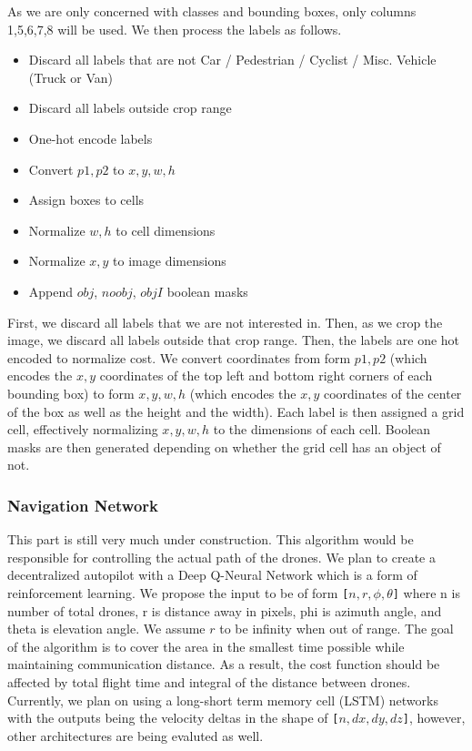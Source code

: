 \documentclass{article}
\begin{document}
As we are only concerned with classes and bounding boxes, only columns 1,5,6,7,8 will be used. We then process the labels as follows.

\begin{itemize}
    \item Discard all labels that are not Car / Pedestrian / Cyclist / Misc. Vehicle (Truck or Van)
    \item Discard all labels outside crop range
    \item One-hot encode labels
    \item Convert $p1, p2$ to $x, y, w, h$
    \item Assign boxes to cells
    \item Normalize $w, h$ to cell dimensions
    \item Normalize $x, y$ to image dimensions
    \item Append $obj$, $noobj$, $objI$ boolean masks
\end{itemize}

First, we discard all labels that we are not interested in. Then, as we crop the image, we discard all labels outside that crop range. Then, the labels are one hot encoded to normalize cost. We convert coordinates from form $p1, p2$ (which encodes the $x, y$ coordinates of the top left and bottom right corners of each bounding box) to form $x, y, w, h$ (which encodes the $x, y$ coordinates of the center of the box as well as the height and the width). Each label is then assigned a grid cell, effectively normalizing $x, y, w, h$ to the dimensions of each cell. Boolean masks are then generated depending on whether the grid cell has an object of not.

\subsubsection{Navigation Network}
This part is still very much under construction. This algorithm would be responsible for controlling the actual path of the drones. We plan to create a decentralized autopilot with a Deep Q-Neural Network which is a form of reinforcement learning. We propose the input to be of form \texttt{[$n, r, \phi, \theta$]} where n is number of total drones, r is distance away in pixels, phi is azimuth angle, and theta is elevation angle. We assume $r$ to be infinity when out of range. The goal of the algorithm is to cover the area in the smallest time possible while maintaining communication distance. As a result, the cost function should be affected by total flight time and integral of the distance between drones. Currently, we plan on using a long-short term memory cell (LSTM) networks with the outputs being the velocity deltas in the shape of \texttt{[$n, dx, dy, dz$]}, however, other architectures are being evaluted as well.
\end{document}
